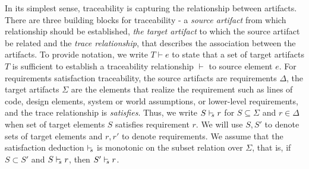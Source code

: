 In its simplest sense, traceability is capturing the relationship between artifacts. There are three building blocks for traceability - a \emph{source artifact} from which relationship should be established, \emph{the target artifact} to which the source artifact be related and the \emph{trace relationship}, that describes the association between the artifacts.  To provide notation, we write $T \vdash e$ to state that a set of target artifacts $T$ is sufficient to establish a traceability relationship $\vdash$ to source element $e$.
For requirements satisfaction traceability, the source artifacts are requirements $\Delta$, the target artifacts $\Sigma$ are the elements that realize the requirement such as lines of code, design elements, system or world assumptions, or lower-level requirements, and the trace relationship is \emph{satisfies}.  Thus, we write $S \vdash_{\!\!s} r$ for $S \subseteq \Sigma$ and $r \in \Delta$ when set of target elements $S$ satisfies requirement $r$.  We will use $S, S'$ to denote sets of target elements and $r, r'$ to denote requirements.
%
%
%
%
We assume that the satisfaction deduction $\vdash_{\!\!s}$ is monotonic on the subset relation over $\Sigma$, that is, if $S \subset S'$ and $S \vdash_{\!\!s} r$, then $S' \vdash_{\!\!s} r$.



